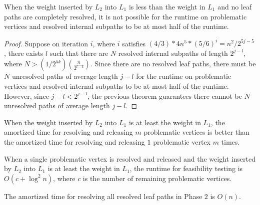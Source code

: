 \documentclass[12pt]{article}
\begin{document}
\begin{spacing}{3}
\begin{theorem}
When the weight inserted by $L_2$ into $L_1$ is less than the weight in $L_1$ and no leaf paths are completely resolved, it is not possible for the runtime on problematic vertices and resolved internal subpaths to be at most half of the runtime.
\end{theorem}
\begin{proof}
Suppose on iteration $i$, where $i$ satisfies $(4/3)*4n^5*(5/6)^i=n^2/2^{5j-5}$, there exists $l$ such that there are $N$ resolved internal subpaths of length $2^{j-l}$, where $N>(1/2^{5k})\left(\frac{n}{2^{l-k}}\right)$. Since there are no resolved leaf paths, there must be $N$ unresolved paths of average length $j-l$ for the runtime on problematic vertices and resolved internal subpaths to be at most half of the runtime. However, since $j-l<2^{j-l}$, the previous theorem guarantees there cannot be $N$ unresolved paths of average length $j-l$.
\end{proof}

\begin{claim}
When the weight inserted by $L_2$ into $L_1$ is at least the weight in $L_1$, the amortized time for resolving and releasing $m$ problematic vertices is better than the amortized time for resolving and releasing $1$ problematic vertex $m$ times.
\end{claim}

\begin{claim}
When a single problematic vertex is resolved and released and the weight inserted by $L_2$ into $L_1$ is at least the weight in $L_1$, the runtime for feasibility testing is $O(c+\log^2n)$, where $c$ is the number of remaining problematic vertices.
\end{claim}

\begin{claim}
The amortized time for resolving all resolved leaf paths in Phase $2$ is $O(n)$.
\end{claim}
\end{spacing}
\end{document}
